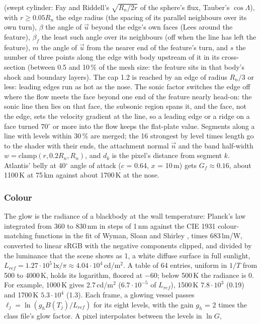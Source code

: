 \documentclass[Orbiter Technical Reference.tex]{subfiles}
\begin{document}
\begin{sloppypar}
\noindent
(swept cylinder: Fay and Riddell's $\sqrt{R_{n}/2r}$ of the sphere's flux, Tauber's $\cos\Lambda$), with $r \ge 0.05R_{n}$ the edge radius (the spacing of its parallel neighbours over its own turn), $\beta$ the angle of $\vec{u}$ beyond the edge's own faces (Lees around the feature), $\beta_{f}$ the least such angle over its neighbours (off when the line has left the feature), $m$ the angle of $\vec{u}$ from the nearer end of the feature's turn, and $s$ the number of three points along the edge with body upstream of it in its cross-section (between 0.5 and 10\,\% of the mesh size: the feature sits in that body's shock and boundary layers). The cap 1.2 is reached by an edge of radius $R_{n}/3$ or less: leading edges run as hot as the nose. The sonic factor switches the edge off where the flow meets the face beyond one end of the feature nearly head-on: the sonic line then lies on that face, the subsonic region spans it, and the face, not the edge, sets the velocity gradient at the line, so a leading edge or a ridge on a face turned 70$^{\circ}$ or more into the flow keeps the flat-plate value. Segments along a line with levels within 30\,\% are merged; the 16 strongest by level times length go to the shader with their ends, the attachment normal $\vec{n}$ and the band half-width $w = \mathrm{clamp}(r, 0.2R_{n}, R_{n})$, and $d_{k}$ is the pixel's distance from segment $k$. Atlantis' belly at 40$^{\circ}$ angle of attack ($c$ = 0.64, $x$ = 10\,m) gets $G_{f} \approx 0.16$, about 1100\,K at 75\,km against about 1700\,K at the nose.

\subsubsection{Colour}
The glow is the radiance of a blackbody at the wall temperature: Planck's law integrated from 360 to 830\,nm in steps of 1\,nm against the CIE 1931 colour-matching functions in the fit of Wyman, Sloan and Shirley \cite{wyman2013}, times 683\,lm/W, converted to linear sRGB with the negative components clipped, and divided by the luminance that the scene shows as 1, a white diffuse surface in full sunlight, $L_{ref} = 1.27\cdot10^{5}\,\mathrm{lx}/\pi \approx 4.04\cdot10^{4}$\,cd/m$^{2}$. A table of 64 entries, uniform in $1/T$ from 500 to 4000\,K, holds its logarithm, floored at $-60$; below 500\,K the radiance is 0. For example, 1000\,K gives 2.7\,cd/m$^{2}$ ($6.7\cdot10^{-5}$ of $L_{ref}$), 1500\,K $7.8\cdot10^{3}$ (0.19) and 1700\,K $5.3\cdot10^{4}$ (1.3). Each frame, a glowing vessel passes $\ell_{j} = \ln(g_{h}B(T_{j})/L_{ref})$ for its eight levels, with the gain $g_{h}$ = 2 times the class file's glow factor. A pixel interpolates between the levels in $\ln G$,


\end{sloppypar}
\end{document}
